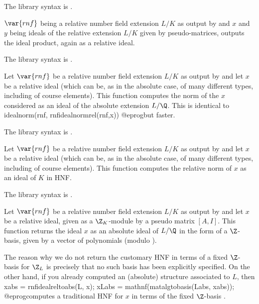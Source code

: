 The library syntax is .

\label{se:rnfidealmul}
$\var{rnf}$ being a relative number
field extension $L/K$ as output by  and $x$ and $y$ being ideals
of the relative extension $L/K$ given by pseudo-matrices, outputs the ideal
product, again as a relative ideal.

The library syntax is .

\label{se:rnfidealnormabs}
Let $\var{rnf}$ be a relative
number field extension $L/K$ as output by  and let $x$ be a
relative ideal (which can be, as in the absolute case, of many different
types, including of course elements). This function computes the norm of the
$x$ considered as an ideal of the absolute extension $L/\Q$. This is
identical to
\bprog
   idealnorm(rnf, rnfidealnormrel(rnf,x))
@eprog\noindent but faster.

The library syntax is .

\label{se:rnfidealnormrel}
Let $\var{rnf}$ be a relative
number field extension $L/K$ as output by  and let $x$ be a
relative ideal (which can be, as in the absolute case, of many different
types, including of course elements). This function computes the relative
norm of $x$ as an ideal of $K$ in HNF.

The library syntax is .

\label{se:rnfidealreltoabs}
Let $\var{rnf}$ be a relative
number field extension $L/K$ as output by  and let $x$ be a
relative ideal, given as a $\Z_K$-module by a pseudo matrix $[A,I]$.
This function returns the ideal $x$ as an absolute ideal of $L/\Q$ in
the form of a $\Z$-basis, given by a vector of polynomials (modulo
).

The reason why we do not return the customary HNF in terms of a fixed
$\Z$-basis for $\Z_L$ is precisely that no such basis has been explicitly
specified. On the other hand, if you already computed an (absolute) 
structure  associated to $L$, then
\bprog
  xabs = rnfidealreltoabs(L, x);
  xLabs = mathnf(matalgtobasis(Labs, xabs));
@eprog\noindent computes a traditional HNF  for $x$ in terms of
the fixed $\Z$-basis .

